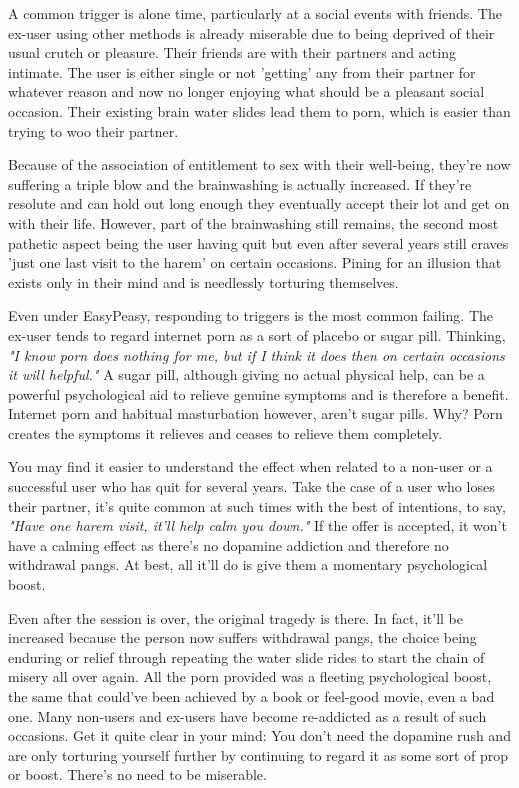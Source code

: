 \documentclass[easypeasy.tex]{subfiles}
\begin{document}
A common trigger is alone time, particularly at a social events with friends. The ex-user using other methods is already miserable due to being deprived of their usual crutch or pleasure. Their friends are with their partners and acting intimate. The user is either single or not 'getting' any from their partner for whatever reason and now no longer enjoying what should be a pleasant social occasion. Their existing brain water slides lead them to porn, which is easier than trying to woo their partner.

Because of the association of entitlement to sex with their well-being, they're now suffering a triple blow and the brainwashing is actually increased. If they're resolute and can hold out long enough they eventually accept their lot and get on with their life. However, part of the brainwashing still remains, the second most pathetic aspect being the user having quit but even after several years still craves 'just one last visit to the harem' on certain occasions. Pining for an illusion that exists only in their mind and is needlessly torturing themselves.

Even under EasyPeasy, responding to triggers is the most common failing. The ex-user tends to regard internet porn as a sort of placebo or sugar pill. Thinking, \textit{"I know porn does nothing for me, but if I think it does then on certain occasions it will helpful."} A sugar pill, although giving no actual physical help, can be a powerful psychological aid to relieve genuine symptoms and is therefore a benefit. Internet porn and habitual masturbation however, aren't sugar pills. Why? Porn creates the symptoms it relieves and ceases to relieve them completely.

You may find it easier to understand the effect when related to a non-user or a successful user who has quit for several years. Take the case of a user who loses their partner, it's quite common at such times with the best of intentions, to say, \textit{"Have one harem visit, it'll help calm you down."} If the offer is accepted, it won't have a calming effect as there's no dopamine addiction and therefore no withdrawal pangs. At best, all it'll do is give them a momentary psychological boost.

Even after the session is over, the original tragedy is there. In fact, it'll be increased because the person now suffers withdrawal pangs, the choice being enduring or relief through repeating the water slide rides to start the chain of misery all over again. All the porn provided was a fleeting psychological boost, the same that could've been achieved by a book or feel-good movie, even a bad one. Many non-users and ex-users have become re-addicted as a result of such occasions. Get it quite clear in your mind: You don't need the dopamine rush and are only torturing yourself further by continuing to regard it as some sort of prop or boost. There's no need to be miserable.
\end{document}
